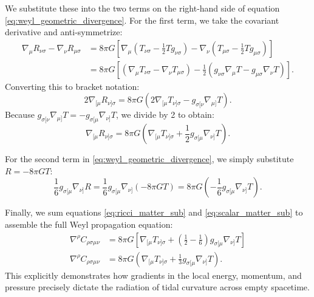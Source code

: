 \documentclass[11pt, a4paper]{report}
\begin{document}
We substitute these into the two terms on the right-hand side of equation \eqref{eq:weyl_geometric_divergence}. For the first term, we take the covariant derivative and anti-symmetrize:
\begin{align}
\nabla_{\mu} R_{\nu\sigma} - \nabla_{\nu} R_{\mu\sigma} &= 8\pi G \left[ \nabla_{\mu} \left( T_{\nu\sigma} - \frac{1}{2}T g_{\nu\sigma} \right) - \nabla_{\nu} \left( T_{\mu\sigma} - \frac{1}{2}T g_{\mu\sigma} \right) \right] \nonumber \\
&= 8\pi G \left[ \left( \nabla_{\mu}T_{\nu\sigma} - \nabla_{\nu}T_{\mu\sigma} \right) - \frac{1}{2} \left( g_{\nu\sigma}\nabla_{\mu}T - g_{\mu\sigma}\nabla_{\nu}T \right) \right].
\end{align}
Converting this to bracket notation:
\begin{equation}
2 \nabla_{[\mu} R_{\nu]\sigma} = 8\pi G \left( 2 \nabla_{[\mu} T_{\nu]\sigma} - g_{\sigma[\nu} \nabla_{\mu]} T \right).
\end{equation}
Because $g_{\sigma[\nu} \nabla_{\mu]} T = -g_{\sigma[\mu} \nabla_{\nu]} T$, we divide by 2 to obtain:
\begin{equation}
\label{eq:ricci_matter_sub}
\nabla_{[\mu} R_{\nu]\sigma} = 8\pi G \left( \nabla_{[\mu} T_{\nu]\sigma} + \frac{1}{2} g_{\sigma[\mu} \nabla_{\nu]} T \right).
\end{equation}

For the second term in \eqref{eq:weyl_geometric_divergence}, we simply substitute $R = -8\pi G T$:
\begin{equation}
\label{eq:scalar_matter_sub}
\frac{1}{6} g_{\sigma[\mu} \nabla_{\nu]} R = \frac{1}{6} g_{\sigma[\mu} \nabla_{\nu]} (-8\pi G T) = 8\pi G \left( -\frac{1}{6} g_{\sigma[\mu} \nabla_{\nu]} T \right).
\end{equation}

Finally, we sum equations \eqref{eq:ricci_matter_sub} and \eqref{eq:scalar_matter_sub} to assemble the full Weyl propagation equation:
\begin{align}
\nabla^{\rho}C_{\rho\sigma\mu\nu} &= 8\pi G \left[ \nabla_{[\mu} T_{\nu]\sigma} + \left( \frac{1}{2} - \frac{1}{6} \right) g_{\sigma[\mu} \nabla_{\nu]} T \right] \nonumber \\
\nabla^{\rho}C_{\rho\sigma\mu\nu} &= 8\pi G \left( \nabla_{[\mu} T_{\nu]\sigma} + \frac{1}{3} g_{\sigma[\mu} \nabla_{\nu]} T \right).
\end{align}
This explicitly demonstrates how gradients in the local energy, momentum, and pressure precisely dictate the radiation of tidal curvature across empty spacetime.
\end{document}
